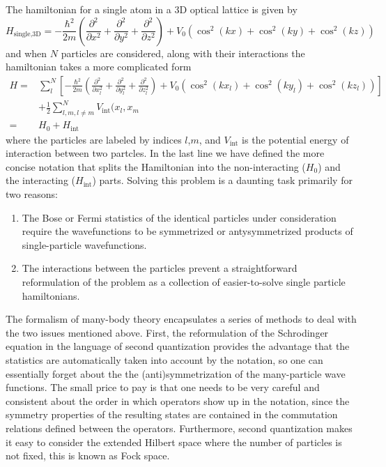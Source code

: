 \documentclass[11pt,letter]{article}
\newcommand{\vo}{\ensuremath{V_{0}}}
\begin{document}
The hamiltonian for a single atom in a 3D
optical lattice is given by  
\begin{equation}
  H_{\text{single,3D}} = - \frac{\hbar^{2}}{2m} \left( \frac{\partial^{2}}{\partial x^{2}}
                            + \frac{\partial^{2}}{\partial y^{2}}
                            + \frac{\partial^{2}}{\partial z^{2}} \right)
 + \vo\left( \cos^{2}(kx)  + \cos^{2}(ky) + \cos^{2}(kz) \right)
\end{equation}
and when $N$ particles are considered, along with their interactions the hamiltonian takes a more complicated form 
\begin{equation}
\begin{split}
  H = & \sum_{l}^{N}\left[ -\frac{\hbar^{2}}{2m} \left( \frac{\partial^{2}}{\partial x_{l}^{2}}
                            + \frac{\partial^{2}}{\partial y_{l}^{2}}
                            + \frac{\partial^{2}}{\partial z_{l}^{2}} \right)
 + \vo\left( \cos^{2}(kx_{l})  + \cos^{2}(ky_{l}) + \cos^{2}(kz_{l}) \right) \right]\\
      &  + \frac{1}{2}\sum_{ l,m, l\neq m}^{N} V_{\mathrm{int}}(x_{l},x_{m} \\ 
    = & H_{0} + H_{\text{int}}
 \label{eq:hubbard1st}
\end{split} 
\end{equation} 
where the particles are labeled by indices $l$,$m$, and
$V_{\mathrm{int}}$ is the potential energy of interaction between two partcles.
In the last line we have defined the more concise notation that splits the
Hamiltonian into the non-interacting ($H_{0}$) and the interacting ($H_{\text{int}}$) parts. Solving this
problem is a daunting task primarily for two reasons:
\begin{enumerate}
    \item The Bose or Fermi statistics of the identical particles under consideration require the wavefunctions to be symmetrized or antysymmetrized products of single-particle wavefunctions.     \item The interactions between the particles prevent a straightforward reformulation of the problem as a collection of easier-to-solve single particle hamiltonians.  
\end{enumerate}

The formalism of many-body theory encapsulates a series of methods to deal with
the two issues mentioned above.   First, the reformulation of the Schrodinger
equation in the language of second quantization provides the advantage that the
statistics are automatically taken into account by the notation, so one can
essentially forget about the the (anti)symmetrization of the many-particle wave
functions.  The small price to pay is that one needs to be very careful and
consistent about the order in which operators show up in the notation, since
the symmetry properties of the resulting states are contained in the
commutation relations defined between the operators.  Furthermore, second
quantization makes it easy to consider the extended Hilbert space where the
number of particles is not fixed, this is known as Fock space. 
\end{document}
